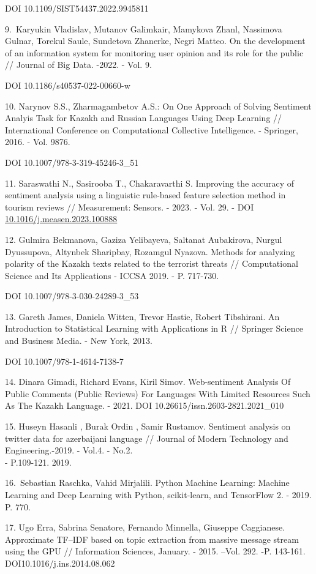 \begin{references}
DOI 10.1109/SIST54437.2022.9945811

9.~Karyukin Vladislav, Mutanov Galimkair, Mamykova Zhanl, Nassimova
Gulnar, Torekul Saule, Sundetova Zhanerke, Negri Matteo. On the
development of an information system for monitoring user opinion and its
role for the public // Journal of Big Data. -2022. - Vol. 9.

DOI 10.1186/s40537-022-00660-w

10. Narynov S.S., Zharmagambetov A.S.: On One Approach of Solving
Sentiment Analyis Task for Kazakh and Russian Languages Using Deep
Learning // International Conference on Computational Collective
Intelligence. - Springer, 2016. - Vol. 9876.

DOI 10.1007/978-3-319-45246-3\_51

11. Saraswathi N., Sasirooba T., Chakaravarthi S. Improving the accuracy
of sentiment analysis using a linguistic rule-based feature selection
method in tourism reviews // Measurement: Sensors. - 2023. - Vol. 29. -
DOI
\href{https://doi.org/10.1016/j.measen.2023.100888}{10.1016/j.measen.2023.100888}

12. Gulmira Bekmanova, Gaziza Yelibayeva, Saltanat Aubakirova, Nurgul
Dyussupova, Altynbek Sharipbay, Rozamgul Nyazova. Methods for analyzing
polarity of the Kazakh texts related to the terrorist threats //
Computational Science and Its Applications - ICCSA 2019. - P. 717-730.

DOI 10.1007/978-3-030-24289-3\_53

13. Gareth James, Daniela Witten, Trevor Hastie, Robert Tibshirani. An
Introduction to Statistical Learning with Applications in R // Springer
Science and Business Media. - New York, 2013.

DOI 10.1007/978-1-4614-7138-7

14. Dinara Gimadi, Richard Evans, Kiril Simov. Web-sentiment Analysis Of
Public Comments (Public Reviews) For Languages With Limited Resources
Such As The Kazakh Language. - 2021. DOI
10.26615/issn.2603-2821.2021\_010

15. Huseyn Hasanli , Burak Ordin , Samir Rustamov. Sentiment analysis on
twitter data for azerbaijani language // Journal of Modern Technology
and Engineering.-2019. - Vol.4. - No.2.\\
- P.109-121. 2019.

16.~Sebastian Raschka, Vahid Mirjalili. Python Machine Learning: Machine
Learning and Deep Learning with Python, scikit-learn, and TensorFlow 2.
- 2019. P. 770.

17. Ugo Erra, Sabrina Senatore, Fernando Minnella, Giuseppe Caggianese.
Approximate TF--IDF based on topic extraction from massive message
stream using the GPU // Information Sciences, January. - 2015. --Vol.
292. -P. 143-161. DOI10.1016/j.ins.2014.08.062
\end{references}

